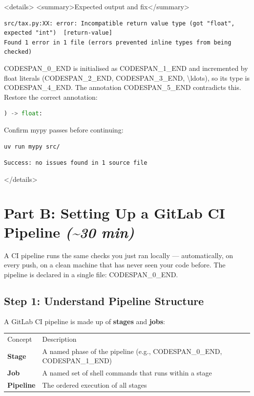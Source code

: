 \documentclass[11pt,a4paper]{book}
\begin{document}
<details>
<summary>Expected output and fix</summary>

\begin{lstlisting}
src/tax.py:XX: error: Incompatible return value type (got "float", expected "int")  [return-value]
Found 1 error in 1 file (errors prevented inline types from being checked)
\end{lstlisting}

CODESPAN\_0\_END is initialised as CODESPAN\_1\_END and incremented by float literals (CODESPAN\_2\_END, CODESPAN\_3\_END, \textbackslash{}ldots{}), so its type is CODESPAN\_4\_END. The annotation CODESPAN\_5\_END contradicts this. Restore the correct annotation:

\begin{lstlisting}[language=Python]
) -> float:
\end{lstlisting}

Confirm mypy passes before continuing:

\begin{lstlisting}[language=Bash]
uv run mypy src/
\end{lstlisting}

\begin{lstlisting}
Success: no issues found in 1 source file
\end{lstlisting}

</details>

\medskip

\section{Part B: Setting Up a GitLab CI Pipeline \textit{(\textasciitilde{}30 min)}}

A CI pipeline runs the same checks you just ran locally --- automatically, on every push, on a clean machine that has never seen your code before. The pipeline is declared in a single file: CODESPAN\_0\_END.

\subsection{Step 1: Understand Pipeline Structure}

A GitLab CI pipeline is made up of \textbf{stages} and \textbf{jobs}:

\begin{tabular}{ll}
\hline
Concept & Description \\
\textbf{Stage} & A named phase of the pipeline (e.g., CODESPAN\_0\_END, CODESPAN\_1\_END) \\
\textbf{Job} & A named set of shell commands that runs within a stage \\
\textbf{Pipeline} & The ordered execution of all stages \\
\hline
\end{tabular}
\end{document}
